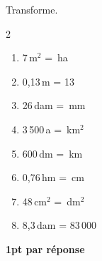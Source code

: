 
\question[8]
Transforme.

\vspace{10pt}
\setlength{\columnsep}{50pt}
\begin{multicols}{2}
\begin{enumerate}[leftmargin=*,align=parleft, label=\alph*), itemsep=15pt]
\item 7\,m$^2$ = \,ha
\item 0,13\,m = 13\,
\item 26\,dam = \,mm
\item 3\,500\,a = \,km$^2$
\item 600\,dm = \,km
\item 0,76\,hm = \,cm
\item 48\,cm$^2$ = \,dm$^2$
\item 8,3\,dam = 83\,000\,
\end{enumerate}
\end{multicols}
\setlength{\columnsep}{10pt}

\begin{solution}[0pt]
\textbf{1pt par réponse}
\end{solution}
